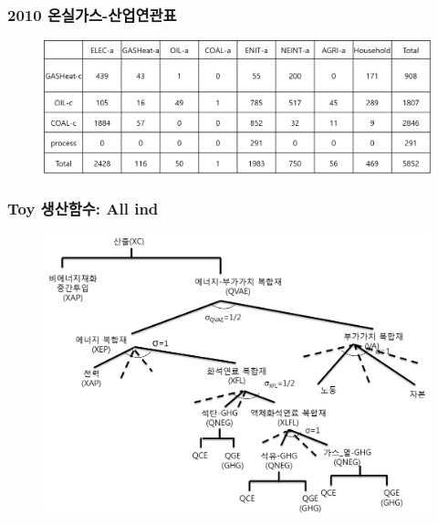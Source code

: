 \documentclass[10pt,compress,slidetop,%
			   hyperref={unicode},xcolor={svgnames},%
			   t]{beamer}
\begin{document}
\begin{frame}
	\frametitle{2010 온실가스-산업연관표 }
		  	\begin{figure}
	\centering
	 \includegraphics[width=1.00\textwidth]{GHGIO.png}
	\end{figure}
\end{frame}



\begin{frame}
	\frametitle{Toy 생산함수: All ind}
		  	\begin{figure}
	\centering
	 \includegraphics[width=1.00\textwidth]{toypro.png}
	\end{figure}	
\end{frame}
\end{document}
